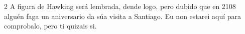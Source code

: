 \begin{multicols}{2}
A figura de Hawking será lembrada, dende logo, pero dubido que en 2108 alguén
faga un aniversario da súa visita a Santiago. Eu non estarei aquí para
comprobalo, pero ti quizais si.








\end{multicols}
